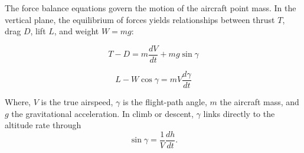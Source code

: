 The force balance equations govern the motion of the aircraft point mass. In the vertical plane, the equilibrium of forces yields relationships between thrust $T$, drag $D$, lift $L$, and weight $W = mg$:

\begin{equation}
T - D = m\frac{dV}{dt} + mg\sin\gamma
\end{equation}

\begin{equation}
L - W\cos\gamma = mV\frac{d\gamma}{dt}
\end{equation}

Where, \(V\) is the true airspeed, \(\gamma\) is the flight-path angle, \(m\) the aircraft mass, and \(g\) the gravitational acceleration. In climb or descent, \(\gamma\) links directly to the altitude rate through
\[\sin\gamma = \frac{1}{V}\frac{dh}{dt}.\]
